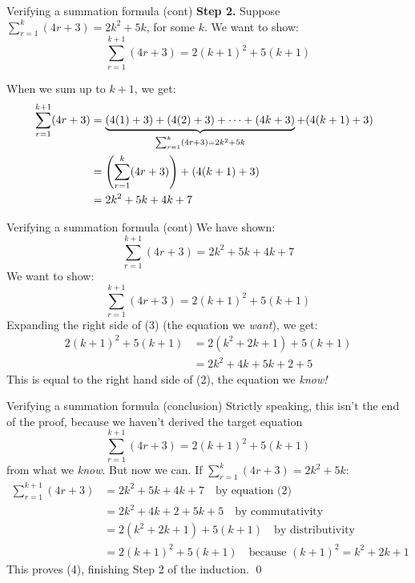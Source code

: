 \documentclass[11pt,aspectratio=1610,handout]{beamer}
\begin{document}
		\begin{frame}{Verifying a summation formula (cont)}
			\textbf{Step 2.} Suppose $\displaystyle \sum_{r=1}^k (4r+3) = 2k^2 + 5k$, for some $k$. \p We want to show: 
			\begin{equation*}
			\sum_{r=1}^{k+1} (4r+3) = 2(k+1)^2 + 5(k+1)
			\end{equation*}
			\p
			
			When we sum up to $k+1$, we get: 
			\begin{eqnarray}
			\hspace{-0.1in}\sum_{r=1}^{k+1} (4r + 3) &= \underbrace{(4(1) + 3) + (4(2) + 3) + \cdots + (4k + 3)}_{\sum_{r=1}^k (4r + 3) = 2k^2+5k} + (4(k+1) + 3) \nonumber\\
			&= \left(\sum_{r=1}^k(4r + 3)\right) + (4(k+1)+3) \nonumber \\
			&= 2k^2 + 5k + 4k + 7
			\end{eqnarray}
		\end{frame}
		
		\begin{frame}{Verifying a summation formula (cont)}
			We have shown: 
			\begin{equation}
			\sum_{r=1}^{k+1} (4r+3) = 2k^2 + 5k + 4k + 7
			\end{equation}
			We want to show: 
			\begin{equation}
			\sum_{r=1}^{k+1}(4r+3) = 2(k+1)^2 + 5(k+1)
			\end{equation}
			Expanding the right side of (3) (the equation we \emph{want}), we get: 
			\begin{align*}
			2(k+1)^2 + 5(k+1) &= 2(k^2 + 2k + 1) + 5(k+1) \\
			&= 2k^2 + 4k + 5k + 2 + 5
			\end{align*}
			This is equal to the right hand side of (2), the equation we \emph{know!}
		\end{frame}
		
		\begin{frame}{Verifying a summation formula (conclusion)}
			Strictly speaking, this isn't the end of the proof, because we haven't derived the target equation 
			\begin{equation}\sum_{r=1}^{k+1}(4r+3) = 2(k+1)^2 + 5(k+1)
			\end{equation}
			\vspace{0in} from what we \emph{know}. But now we can. If $\displaystyle \sum_{r=1}^k(4r+3) = 2k^2 + 5k$: 
			\begin{align*}
			\sum_{r=1}^{k+1}(4r+3) &= 2k^2 + 5k + 4k + 7 \quad \textrm{by equation (2)} \\
			&= 2k^2 + 4k + 2 + 5k + 5 \quad \textrm{by commutativity} \\
			&= 2(k^2 + 2k + 1) + 5(k+1) \quad \textrm{by distributivity} \\
			&= 2(k+1)^2 + 5(k+1) \quad \textrm{because $(k+1)^2 = k^2 + 2k + 1$}
			\end{align*}
			This proves (4), finishing Step 2 of the induction. \qed
		\end{frame}
		
\end{document}
